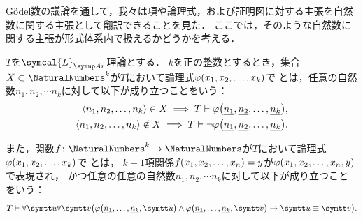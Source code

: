 Gödel数の議論を通して，我々は項や論理式，および証明図に対する主張を自然数に関する主張として翻訳できることを見た．
ここでは，そのような自然数に関する主張が形式体系内で扱えるかどうかを考える．

\begin{Def} \label{Def:representation}
	\(T\)を\(\symcal{L}_{\Ar}\)理論とする．
	\(k\)を正の整数とするとき，集合\(X \subset \NaturalNumbers^k\)が\(T\)において論理式\(\apply{\varphi}{x_1, x_2, \dots, x_k}\)で
	とは，任意の自然数\(n_1, n_2, \dotsm n_k\)に対して以下が成り立つことをいう：
	\begin{align}
		\pair{n_1, n_2, \dots, n_k} \in X \metaimplies T \provable \apply{\varphi}{\numeral{n_1}, \numeral{n_2}, \dots, \numeral{n_k}},
		\label{eq:representationtrue} \\
		\pair{n_1, n_2, \dots, n_k} \notin X \metaimplies T \provable \lnot \apply{\varphi}{\numeral{n_1}, \numeral{n_2}, \dots, \numeral{n_k}}.
		\label{eq:representationfalse}
	\end{align}

	また，関数\(f \colon \NaturalNumbers^k \to \NaturalNumbers\)が\(T\)において論理式\(\apply{\varphi}{x_1, x_2, \dots, x_k}\)で
	とは，
	\(k + 1\)項関係\(\apply{f}{x_1, x_2, \dots, x_n} = y\)が\(\apply{\varphi}{x_1, x_2, \dots, x_n, y}\)で表現され，
	かつ任意の任意の自然数\(n_1, n_2, \dotsm n_k\)に対して以下が成り立つことをいう：
	\begin{equation}
		T \provable \forall \obj{u} \forall \obj{v} \paren{
			\apply{\varphi}{\numeral{n_1}, \dots, \numeral{n_k}, \obj{u}}
			\land \apply{\varphi}{\numeral{n_1}, \dots, \numeral{n_k}, \obj{v}}
			\to \obj{u} \objeq \obj{v}
		}.
		\label{eq:representationfunction}
	\end{equation}
\end{Def}


